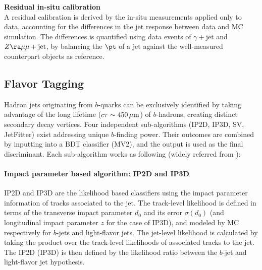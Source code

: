 \begin{description}
\item \textbf{Residual in-situ calibration} \\
A residual calibration is derived by the in-situ measurements applied only to data, 
accounting for the differences in the jet response between data and MC simulation.
The differences is quantified using data events of $\gamma+\mathrm{jet}$ and $Z\ra \mu\mu + \mathrm{jet}$,
by balancing the $\pt$ of a jet against the well-measured counterpart objects as reference. \\

\end{description}





\subsection{Flavor Tagging} \label{sec::objDef::jets::btag}
Hadron jets originating from $b$-quarks can be exclusively identified 
by taking advantage of the long lifetime ($c\tau\sim 450 \, \mathrm{\mu m}$) of $b$-hadrons,
creating distinct secondary decay vertices. 
Four independent sub-algorithms (IP2D, IP3D, SV, JetFitter) exist addressing unique $b$-finding power. 
Their outcomes are combined by inputting into a BDT classifier (MV2), and the output is used as the final discriminant. Each sub-algorithm works as following (widely referred from \cite{150_bTag_Run2_exp} \cite{151_bTag_Run2_perf} \cite{bTag_Run2_2015data}): 

\paragraph{Impact parameter based algorithm: IP2D and IP3D}
IP2D and IP3D are the likelihood based classifiers using the impact parameter information of tracks associated to the jet. 
The track-level likelihood is defined in terms of the transverse impact parameter $d_0$ and its error $\sigma(d_0)$ (and longitudinal impact parameter $z$ for the case of IP3D), and modeled by MC respectively for $b$-jets and light-flavor jets. The jet-level likelihood is calculated by taking the product over the track-level likelihoods of associated tracks to the jet.
The IP2D (IP3D) is then defined by the likelihood ratio between the $b$-jet and light-flavor jet hypothesis.


